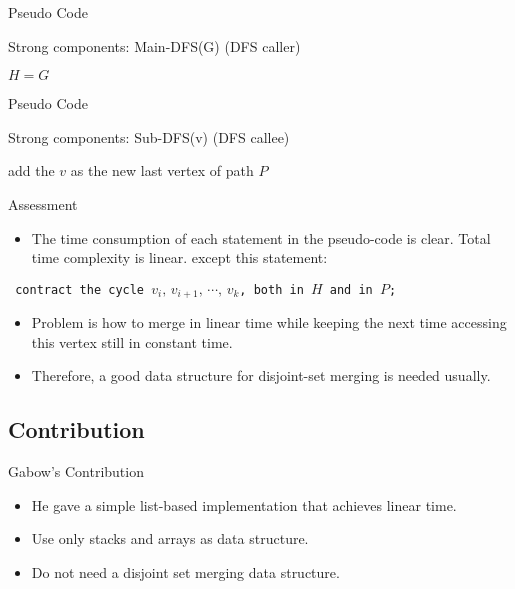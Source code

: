 \documentclass{beamer}
\begin{document}
\begin{frame}{Pseudo Code}
	\SetAlFnt{\normalsize}
	\begin{algorithm}[H]
		\caption{Strong components: Main-DFS(G) (DFS caller)}
		$H=G$\;
	\end{algorithm}
\end{frame}

\begin{frame}{Pseudo Code}
	\SetAlFnt{\normalsize}
	\begin{algorithm}[H]
		\caption{Strong components: Sub-DFS(v) (DFS callee)}
		add the $v$ as the new last vertex of path $P$\;
	\end{algorithm}
\end{frame}



\begin{frame}{Assessment}
	\begin{itemize}
		\item
		The time consumption of each statement in the pseudo-code is clear. Total time complexity is linear.
		except this statement:
	\end{itemize}
	\begin{center}
		\texttt{\small 
		contract the cycle $v_i,\, v_{i+1},\,\cdots,\,v_k$, both in $H$ and in $P$;
		}
	\end{center}	
	\begin{itemize}
		\item
		Problem is how to merge in linear time while keeping the next time accessing this vertex still in constant time.
		\item
		Therefore, a good data structure for disjoint-set merging is needed usually.
	\end{itemize}
\end{frame}


\subsection{Contribution}

\begin{frame}{Gabow's Contribution}%

	\begin{itemize}
		\item
		He gave a simple list-based implementation that achieves linear time.
		\item
		Use only stacks and arrays as data structure. %
		\item
		Do not need a disjoint set merging data structure.
	\end{itemize}
\end{frame}
\end{document}
